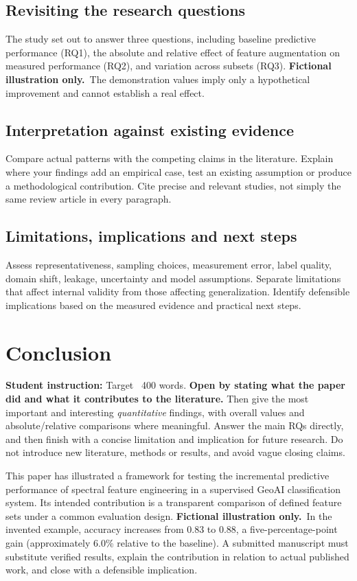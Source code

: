 \documentclass[11pt,letterpaper]{article}
\newcommand{\guide}[1]{\par\begingroup\color{blue!60!black}\small\textbf{Student
instruction:} #1\par\endgroup}
\newcommand{\fiction}{\textbf{Fictional illustration only.}}
\begin{document}
\subsection{Revisiting the research questions}
The study set out to answer three questions, including baseline predictive performance (RQ1), the
absolute and relative effect of feature augmentation on measured performance (RQ2), and
variation across subsets (RQ3). 
\fiction\ The demonstration values imply only a hypothetical improvement and cannot
establish a real effect.
\subsection{Interpretation against existing evidence}
Compare actual patterns with the competing claims in the literature. Explain where your findings add an empirical
case, test an existing assumption or produce a methodological contribution. Cite precise
and relevant studies, not simply the same review article in every paragraph.
\subsection{Limitations, implications and next steps}
Assess representativeness, sampling choices, measurement error, label quality,
domain shift, leakage, uncertainty and model assumptions. Separate limitations
that affect internal validity from those affecting generalization. Identify defensible
implications based on the measured evidence and practical next steps.

\section{Conclusion}
\guide{Target ~400 words. \textbf{Open by stating what the paper did and what it
contributes to the literature.} Then give the most important and interesting
\emph{quantitative} findings, with overall values and absolute/relative comparisons where
meaningful. Answer the main RQs directly, and then finish with a concise limitation and
implication for future research. Do not introduce new literature, methods or results, and avoid vague closing
claims.}
This paper has illustrated a framework for testing the incremental predictive performance
of spectral feature engineering in a supervised GeoAI classification system. Its intended
contribution is a transparent comparison of defined feature sets under a common evaluation
design. \fiction\ In the invented example, accuracy increases from 0.83 to 0.88, a
five-percentage-point gain (approximately 6.0\% relative to the baseline). A submitted manuscript must
substitute verified results, explain the contribution in relation to actual published
work, and close with a defensible implication.
\end{document}
